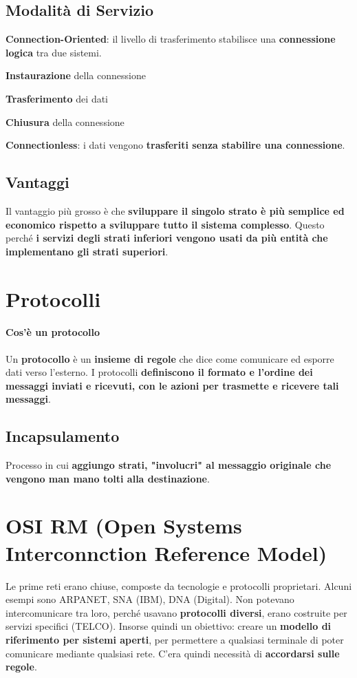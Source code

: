 \documentclass[10pt]{article}
\begin{document}
\subsection{Modalità di Servizio}
\begin{list}{}{I \textbf{dati} possono essere scambiati in due modalità diverse:}
\item \textbf{Connection-Oriented}: il livello di trasferimento stabilisce una \textbf{connessione logica} tra due sistemi.
\begin{list}{--}{La connessione è quindi \textbf{gestita}:}
\item \textbf{Instaurazione} della connessione
\item \textbf{Trasferimento} dei dati
\item \textbf{Chiusura} della connessione
\end{list}
\item \textbf{Connectionless}: i dati vengono \textbf{trasferiti senza stabilire una connessione}.
\end{list}
\subsection{Vantaggi}
Il vantaggio più grosso è che \textbf{sviluppare il singolo strato è più semplice ed economico rispetto a sviluppare tutto il sistema complesso}. Questo perché \textbf{i servizi degli strati inferiori vengono usati da più entità che implementano gli strati superiori}.
\pagebreak
\section{Protocolli}
\paragraph{Cos'è un protocollo} Un \textbf{protocollo} è un \textbf{insieme di regole} che dice come comunicare ed esporre dati verso l'esterno. I protocolli \textbf{definiscono il formato e l'ordine dei messaggi inviati e ricevuti, con le azioni per trasmette e ricevere tali messaggi}.
\subsection{Incapsulamento} Processo in cui \textbf{aggiungo strati, "involucri" al messaggio originale che vengono man mano tolti alla destinazione}.
\section{OSI RM (Open Systems Interconnction Reference Model)}
Le prime reti erano chiuse, composte da tecnologie e protocolli proprietari. Alcuni esempi sono ARPANET, SNA (IBM), DNA (Digital). Non potevano intercomunicare tra loro, perché usavano \textbf{protocolli diversi}, erano costruite per servizi specifici (TELCO). Insorse quindi un obiettivo: creare un \textbf{modello di riferimento per sistemi aperti}, per permettere a qualsiasi terminale di poter comunicare mediante qualsiasi rete. C'era quindi necessità di \textbf{accordarsi sulle regole}.
\end{document}
